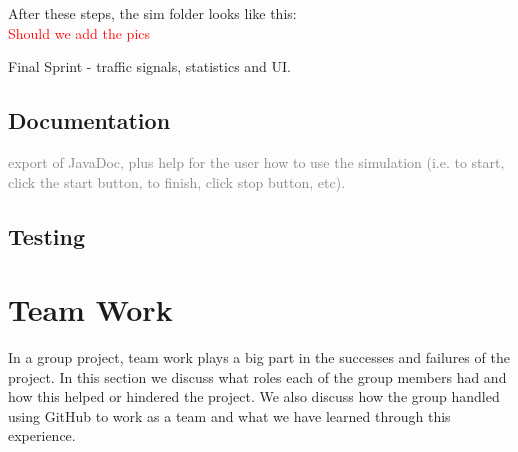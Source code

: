 \documentclass{article}
\begin{document}
\noindent
After these steps, the sim folder looks like this: \\
\textcolor{red}{Should we add the pics}

Final Sprint - traffic signals, statistics and UI. 

	\subsection{Documentation}
		\textcolor{gray}{export of JavaDoc, plus help for the user how to use the simulation (i.e. to start, click the start button, to finish, click stop button, etc).}
		
		
	\subsection{Testing}

\section{Team Work}
In a group project, team work plays a big part in the successes and failures of the project. In this section we discuss what roles each of the group members had and how this helped or hindered the project. We also discuss how the group handled using GitHub to work as a team and what we have learned through this experience. 
\end{document}
